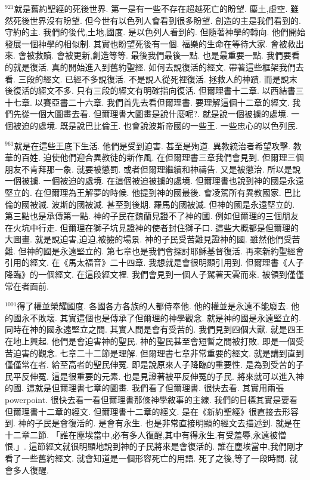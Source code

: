 \documentclass{book}
\begin{document}
$^{921}$就是舊約聖經的死後世界.
第一是有一些不存在超越死亡的盼望.
塵土,虛空.
雖然死後世界沒有盼望.
但今世有以色列人會看到很多盼望.
創造的主是我們看到的.
守約的主.
我們的後代,土地,國度.
是以色列人看到的.
但隨著神學的轉向.
他們開始發展一個神學的相似制.
其實也盼望死後有一個.
福樂的生命在等待大家.
會被救出來.
會被救贖.
會被更新,創造等等.
最後我們最後一點.
也是最重要一點.
我們要看的就是復活.
真的開始進入到舊約聖經.
如何去說復活的經文.
帶著這些框架我們去看.
三段的經文.
已經不多說復活.
不是說人從死裡復活.
拯救人的神蹟.
而是說末後復活的經文不多.
只有三段的經文有明確指向復活.
但爾理書十二章.
以西結書三十七章.
以賽亞書二十六章.
我們首先去看但爾理書.
要理解這個十二章的經文.
我們先從一個大圖畫去看.
但爾理書大圖畫是說什麼呢?.
就是說一個被擄的處境.
一個被迫的處境.
既是說巴比倫王.
也會說波斯帝國的一些王.
一些忠心的以色列民.

$^{961}$就是在這些王底下生活.
他們是受到迫害.
甚至是殉道.
異教統治者希望攻擊.
教華的百姓.
迫使他們迎合異教徒的新作風.
在但爾理書三章我們會見到.
但爾理三個朋友不肯拜那一象.
就要被懲罰.
或者但爾理繼續和神禱告.
又是被懲治.
所以是說一個被擄.
一個被迫的處境.
在這個被迫被擄的處境.
但爾理書也說到神的國是永遠堅立的.
在但爾理為王解夢的時候.
他提到神的國最後.
會凌駕所有異教國家.
巴比倫的國被滅.
波斯的國被滅.
甚至到後期.
羅馬的國被滅.
但神的國是永遠堅立的.
第三點也是承傳第一點.
神的子民在魏蘭見證不了神的國.
例如但爾理的三個朋友在火坑中行走.
但爾理在獅子坑見證神的使者封住獅子口.
這些大概都是但爾理的大圖畫.
就是說迫害,迫迫,被擄的場景.
神的子民受苦難見證神的國.
雖然他們受苦難.
但神的國是永遠堅立的.
第七章也是我們會探討耶穌基督復活.
再來新約聖經會引用的經文.
在《馬太福音》二十四章.
我想就是會很明顯引用到.
但爾理書《人子降臨》的一個經文.
在這段經文裡.
我們會見到一個人子駕著天雲而來.
被領到僅僅常在者面前.

$^{1001}$得了權並榮耀國度.
各國各方各族的人都侍奉他.
他的權並是永遠不能廢去.
他的國永不敗壞.
其實這個也是傳承了但爾理的神學觀念.
就是神的國是永遠堅立的.
同時在神的國永遠堅立之間.
其實人間是會有受苦的.
我們見到四個大獸.
就是四王在地上興起.
他們是會迫害神的聖民.
神的聖民甚至會短暫之間被打敗.
即是一個受苦迫害的觀念.
七章二十二節是理解.
但爾理書七章非常重要的經文.
就是講到直到僅僅常在者.
給至高者的聖民伸冤.
即是說原來人子降臨的重要性.
是為到受苦的子民平反伸冤.
這是很重要的元素.
也是見證著被平反伸冤的子民.
將來就可以進入神的國.
這就是但爾理書七章的圖畫.
我們看了但爾理書.
很快去看.
其實用兩張powerpoint.
很快去看一看但爾理書那條神學敘事的主線.
我們的目標其實是要看但爾理書十二章的經文.
但爾理書十二章的經文.
是在《新約聖經》很直接去形容到.
神的子民是會復活的.
是會有永生.
也是非常直接明顯的經文去描述到.
就是在十二章二節.
「誰在塵埃當中,必有多人復醒,其中有得永生,有受羞辱,永遠被憎恨.」.
這節經文就很明顯地說到神的子民將來是會復活的.
誰在塵埃當中,我們剛才看了一些舊約經文.
就會知道是一個形容死亡的用語.
死了之後,等了一段時間.
就會多人復醒.
\end{document}
